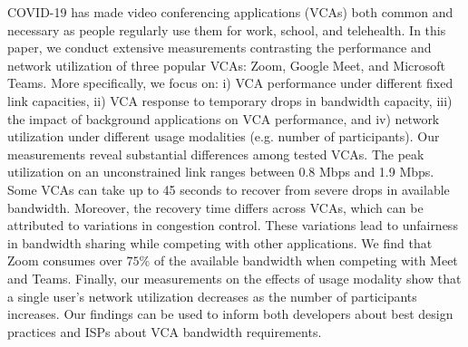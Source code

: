 {COVID-19 has made video conferencing applications (VCAs) both common and necessary as people regularly use them for work, school, and telehealth. In this paper, we conduct extensive measurements contrasting the performance and network utilization of three popular VCAs: Zoom, Google Meet, and Microsoft Teams. More specifically, we focus on: i) VCA performance under different fixed link capacities, ii) VCA response to temporary drops in bandwidth capacity, iii) the impact of background applications on VCA performance, and iv) network utilization under different usage modalities (e.g. number of participants). Our measurements reveal substantial differences among tested VCAs. The peak utilization on an unconstrained link ranges between 0.8 Mbps and 1.9 Mbps. Some VCAs can take up to 45 seconds to recover from severe drops in available bandwidth. Moreover, the recovery time differs across VCAs, which can be attributed to variations in congestion control. These variations lead to unfairness in bandwidth sharing while competing with other applications. We find that Zoom consumes over $75\%$ of the available bandwidth when competing with Meet and Teams. Finally, our measurements on the effects of usage modality show that a single user's network utilization decreases as the number of participants increases. Our findings can be used to inform both developers about best design practices and ISPs about VCA bandwidth requirements.




}


